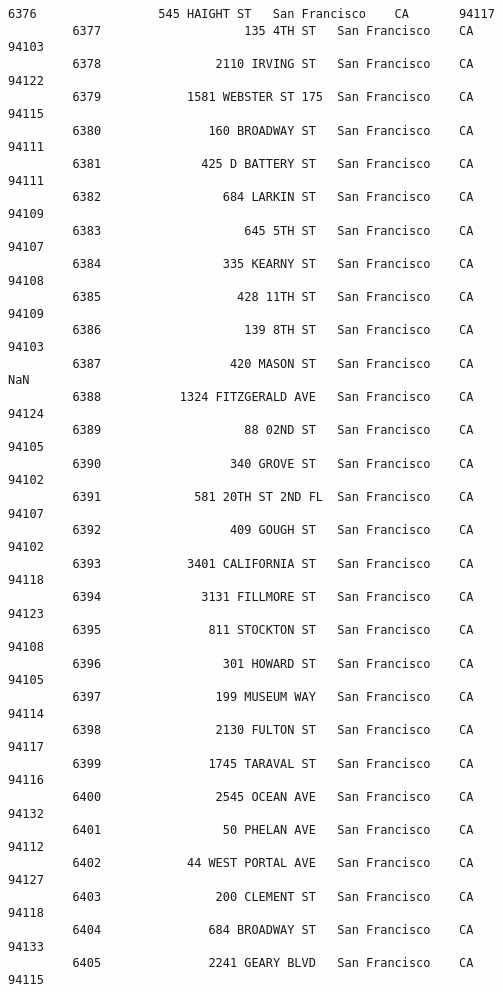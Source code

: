 \documentclass[11pt]{article}
\begin{document}
\begin{Verbatim}[commandchars=\\\{\}]
         6376                 545 HAIGHT ST   San Francisco    CA       94117   
         6377                    135 4TH ST   San Francisco    CA       94103   
         6378                2110 IRVING ST   San Francisco    CA       94122   
         6379            1581 WEBSTER ST 175  San Francisco    CA       94115   
         6380               160 BROADWAY ST   San Francisco    CA       94111   
         6381              425 D BATTERY ST   San Francisco    CA       94111   
         6382                 684 LARKIN ST   San Francisco    CA       94109   
         6383                    645 5TH ST   San Francisco    CA       94107   
         6384                 335 KEARNY ST   San Francisco    CA       94108   
         6385                   428 11TH ST   San Francisco    CA       94109   
         6386                    139 8TH ST   San Francisco    CA       94103   
         6387                  420 MASON ST   San Francisco    CA         NaN   
         6388           1324 FITZGERALD AVE   San Francisco    CA       94124   
         6389                    88 02ND ST   San Francisco    CA       94105   
         6390                  340 GROVE ST   San Francisco    CA       94102   
         6391             581 20TH ST 2ND FL  San Francisco    CA       94107   
         6392                  409 GOUGH ST   San Francisco    CA       94102   
         6393            3401 CALIFORNIA ST   San Francisco    CA       94118   
         6394              3131 FILLMORE ST   San Francisco    CA       94123   
         6395               811 STOCKTON ST   San Francisco    CA       94108   
         6396                 301 HOWARD ST   San Francisco    CA       94105   
         6397                199 MUSEUM WAY   San Francisco    CA       94114   
         6398                2130 FULTON ST   San Francisco    CA       94117   
         6399               1745 TARAVAL ST   San Francisco    CA       94116   
         6400                2545 OCEAN AVE   San Francisco    CA       94132   
         6401                 50 PHELAN AVE   San Francisco    CA       94112   
         6402            44 WEST PORTAL AVE   San Francisco    CA       94127   
         6403                200 CLEMENT ST   San Francisco    CA       94118   
         6404               684 BROADWAY ST   San Francisco    CA       94133   
         6405               2241 GEARY BLVD   San Francisco    CA       94115   
         

\end{Verbatim}
\end{document}
